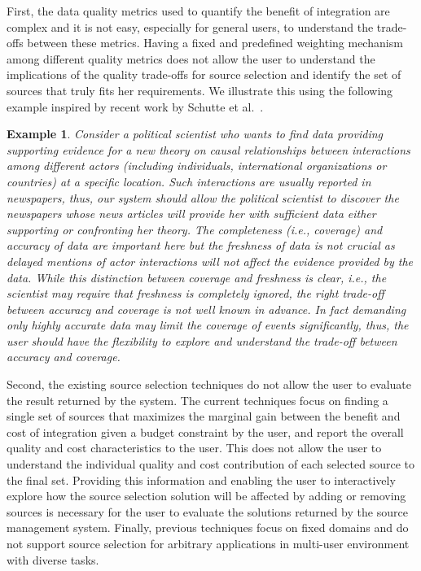 \documentclass{sig-alternate}
\newtheorem{example}{Example}
\begin{document}
First, the data quality metrics used to quantify the benefit of integration are complex and it is not easy, especially for general users, to understand the trade-offs between these metrics. Having a fixed and predefined weighting mechanism among different quality metrics does not allow the user to understand the implications of the quality trade-offs for source selection and identify the set of sources that truly fits her requirements. We illustrate this using the following example inspired by recent work by Schutte et al.~\cite{schutte:2014}.
\vspace{-5pt}
\begin{example}
Consider a political scientist who wants to find data providing supporting evidence for a new theory on causal relationships between interactions among different actors (including individuals, international organizations or countries) at a specific location. Such interactions are usually reported in newspapers, thus, our system should allow the political scientist to discover the newspapers whose news articles will provide her with sufficient data either supporting or confronting her theory. The completeness (i.e., coverage) and accuracy of data are important here but the freshness of data is not crucial as delayed mentions of actor interactions will not affect the evidence provided by the data. While this distinction between coverage and freshness is clear, i.e., the scientist may require that freshness is completely ignored, the right trade-off between accuracy and coverage is not well known in advance. In fact demanding only highly accurate data may limit the coverage of events significantly, thus, the user should have the flexibility to explore and understand the trade-off between accuracy and coverage. 
\end{example}
Second, the existing source selection techniques do not allow the user to evaluate the result returned by the system. The current techniques focus on finding a single set of sources that maximizes the marginal gain between the benefit and cost of integration given a budget constraint by the user, and report the overall quality and cost characteristics to the user. This does not allow the user to understand the individual quality and cost contribution of each selected source to the final set. Providing this information and enabling the user to interactively explore how the source selection solution will be affected by adding or removing sources is necessary for the user to evaluate the solutions returned by the source management system. Finally, previous techniques focus on fixed domains and do not support source selection for arbitrary applications in multi-user environment with diverse tasks.  
\end{document}
